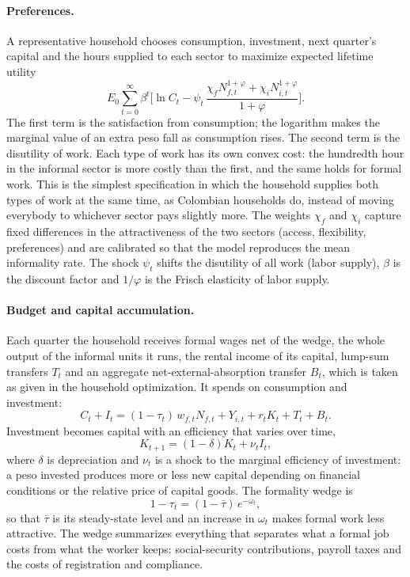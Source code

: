 \paragraph{Preferences.} A representative household chooses consumption, investment, next quarter's capital and the hours supplied to each sector to maximize expected lifetime utility
\begin{equation}
E_0 \sum_{t=0}^{\infty}\beta^t\Big[\ln C_t - \psi_t\,\frac{\chi_f N_{f,t}^{1+\varphi} + \chi_i N_{i,t}^{1+\varphi}}{1+\varphi}\Big].
\label{eq:utility}
\end{equation}
The first term is the satisfaction from consumption; the logarithm makes the marginal value of an extra peso fall as consumption rises. The second term is the disutility of work. Each type of work has its own convex cost: the hundredth hour in the informal sector is more costly than the first, and the same holds for formal work. This is the simplest specification in which the household supplies both types of work at the same time, as Colombian households do, instead of moving everybody to whichever sector pays slightly more. The weights $\chi_f$ and $\chi_i$ capture fixed differences in the attractiveness of the two sectors (access, flexibility, preferences) and are calibrated so that the model reproduces the mean informality rate. The shock $\psi_t$ shifts the disutility of all work (labor supply), $\beta$ is the discount factor and $1/\varphi$ is the Frisch elasticity of labor supply.

\paragraph{Budget and capital accumulation.} Each quarter the household receives formal wages net of the wedge, the whole output of the informal units it runs, the rental income of its capital, lump-sum transfers $T_t$ and an aggregate net-external-absorption transfer $B_t$, which is taken as given in the household optimization. It spends on consumption and investment:
\begin{equation}
C_t + I_t = (1-\tau_t)\,w_{f,t}N_{f,t} + Y_{i,t} + r_t K_t + T_t + B_t .
\label{eq:budget}
\end{equation}
Investment becomes capital with an efficiency that varies over time,
\begin{equation}
K_{t+1} = (1-\delta)K_t + \nu_t I_t ,
\label{eq:capital}
\end{equation}
where $\delta$ is depreciation and $\nu_t$ is a shock to the marginal efficiency of investment: a peso invested produces more or less new capital depending on financial conditions or the relative price of capital goods. The formality wedge is
\begin{equation}
1-\tau_t = (1-\bar\tau)\,e^{-\omega_t},
\label{eq:wedge}
\end{equation}
so that $\bar\tau$ is its steady-state level and an increase in $\omega_t$ makes formal work less attractive. The wedge summarizes everything that separates what a formal job costs from what the worker keeps: social-security contributions, payroll taxes and the costs of registration and compliance.

